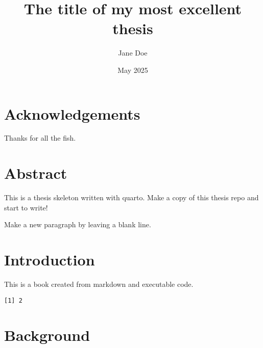 \documentclass[
  a4paper,
  headsepline=true,
  open=any]{scrbook}
\title{The title of my most excellent thesis}
\author{Jane Doe}
\date{May 2025}
\begin{document}
\frontmatter
\maketitle
\ifdefined\Shaded\renewenvironment{Shaded}{\begin{tcolorbox}[sharp corners, interior hidden, borderline west={3pt}{0pt}{shadecolor}, boxrule=0pt, frame hidden, enhanced, breakable]}{\end{tcolorbox}}\fi

\mainmatter
{}

\hypertarget{acknowledgements}{%
\chapter*{Acknowledgements}\label{acknowledgements}}


Thanks for all the fish.


\hypertarget{abstract}{%
\chapter*{Abstract}\label{abstract}}


This is a thesis skeleton written with quarto. Make a copy of this
thesis repo and start to write!

Make a new paragraph by leaving a blank line.

\newpage
\tableofcontents


\hypertarget{introduction}{%
\chapter{Introduction}\label{introduction}}

This is a book created from markdown and executable code.

\begin{verbatim}
[1] 2
\end{verbatim}


\hypertarget{background}{%
\chapter{Background}\label{background}}
\end{document}
